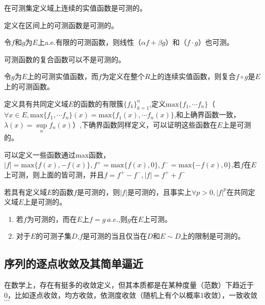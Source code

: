 \documentclass[12pt, a4paper, oneside, UTF8]{ctexbook}
\begin{document}
\begin{proposition}
	\begin{change}
		\item 在可测集定义域上连续的实值函数是可测的。
		\item 定义在区间上的可测函数是可测的。
		\item 令$f$和$g$为$E$上a.e.有限的可测函数，则线性（$\alpha f + \beta g$）和（$f\cdot g$）也可测。
		\item  可测函数的复合函数可以不是可测的。
		\item 令$g$为$E$上的可测实值函数，而$f$为定义在整个$R$上的连续实值函数，则复合$f \circ g $是$E$上的可测函数。
		\item 定义具有共同定义域$E$的函数的有限簇$\{ f_k\}_{k=1}^n$,定义$ \text{max}\{f_1,\cdots f_n\} $（$\forall x \in E,\text{max}\{f_1,\cdots f_n\}(x)=\text{max}\{f_1(x),\cdots f_n(x)\}$,和上确界函数一致，$\lambda (x)=\sup\limits_{n} f_n(x)$）,下确界函数同样定义，可以证明这些函数在$E$上是可测的。
		\item 可以定义一些函数通过max函数，$|f|=\text{max}\{f(x),-f(x)\},f^+=\text{max}\{f(x),0\},f^-=\text{max}\{-f(x),0\}$,若$f$在$E$上可测，则上面的皆可测，并且$f=f^{+}-f^-,|f|=f^{+}+f^-$
	\end{change}
\end{proposition}

	\begin{corollary}
	若具有定义域$E$的函数$f$是可测的，则$|f|$是可测的，且事实上$\forall p >0,|f|^p$在共同定义域$E$上是可测的。
\end{corollary}

\begin{proposition}
	\begin{enumerate}[label=\Roman*]
		 令$f$为$	E$上扩充的实值函数。
		\item  若$f$为可测的，而在$E$上$f=g \ a.e.$,则$g$在$E$上可测。
		\item 对于$E$的可测子集$D$,$f$是可测的当且仅当在$D$和$E\sim D$上的限制是可测的。
	\end{enumerate}
\end{proposition}

\subsection{序列的逐点收敛及其简单逼近}
在数学上，存在有挺多的收敛定义，但其本质都是在某种度量（范数）下趋近于0，比如逐点收敛，均方收敛，依测度收敛（随机上有个以概率1收敛），一致收敛 $\cdots$
\end{document}
